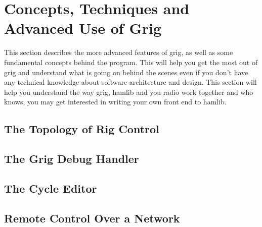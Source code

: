 \section{Concepts, Techniques and Advanced Use of Grig}
\label{sec:advanced}

This section describes the more advanced features of grig, as well as
some fundamental concepts behind the program. This will help you
get the most out of grig and understand what is going on behind the
scenes even if you don't have any technical knowledge about software
architecture and design. This section will help you understand the
 way grig, hamlib and you radio work together and who knows, you may get
 interested in writing your own front end to hamlib.


\subsection{The Topology of Rig Control}\label{subsec:idea}


\subsection{The Grig Debug Handler}\label{subsec:debhand}


\subsection{The Cycle Editor}\label{subsec:cycle}


\subsection{Remote Control Over a Network}\label{subsec:network}
